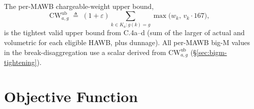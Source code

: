 \documentclass[11pt,a4paper]{article}
\newcommand{\defeq}{\triangleq}
\theoremstyle{definition}
\begin{document}
The per-MAWB chargeable-weight upper bound,
\begin{equation}
  \text{CW}^{\text{ub}}_{a,g} \;\defeq\; (1 + \varepsilon) \sum_{k \in K_a : g(k) = g} \max\bigl(w_k,\, v_k \cdot 167\bigr),
  \label{eq:cw-ub}
\end{equation}
is the tightest valid upper bound from C.4a--d (sum of the larger of actual
and volumetric for each eligible HAWB, plus dunnage). All per-MAWB
big-M values in the break-disaggregation use a scalar derived from
$\text{CW}^{\text{ub}}_{a,g}$ (\S\ref{sec:bigm-tightening}).

\section{Objective Function}
\label{sec:objective}
\end{document}
